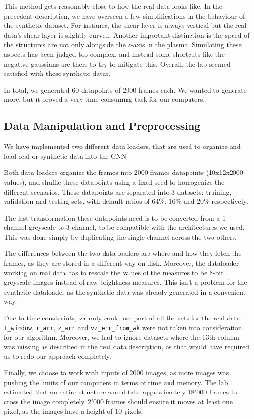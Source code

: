\documentclass[10pt,conference]{IEEEtran}
\begin{document}
This method gets reasonably close to how the real data looks like. In the precedent description, we have overseen a few simplifications in the behaviour of the synthetic dataset. For instance, the shear layer is always vertical but the real data's shear layer is slightly curved. Another important distinction is the speed of the structures are not only alongside the $z$-axis in the plasma. Simulating these aspects has been judged too complex, and instead some shortcuts like the negative gaussians are there to try to mitigate this. Overall, the lab seemed satisfied with these synthetic datas.\par
In total, we generated 60 datapoints of 2000 frames each. We wanted to generate more, but it proved a very time consuming task for our computers.
 


\subsection{Data Manipulation and Preprocessing}
We have implemented two different data loaders, that are used to organize and load real or synthetic data into the CNN.\par
Both data loaders organize the frames into 2000-frames datapoints (10x12x2000 values), and shuffle these datapoints using a fixed seed to homogenize the different scenarios. These datapoints are separated into 3 datasets: training, validation and testing sets, with default ratios of 64\%, 16\% and 20\% respectively.\par
The last transformation these datapoints need is to be converted from a 1-channel greyscale to 3-channel, to be compatible with the architectures we used. This was done simply by duplicating the single channel across the two others.\par
The differences between the two data loaders are where and how they fetch the frames, as they are stored in a different way on disk. Moreover, the dataloader working on real data has to rescale the values of the measures to be 8-bit greyscale images instead of raw brightness measures. This isn't a problem for the synthetic dataloader as the synthetic data was already generated in a convenient way.

Due to time constraints, we only could use part of all the sets for the real data: \texttt{t\_window}, \texttt{r\_arr}, \texttt{z\_arr} and \texttt{vz\_err\_from\_wk} were not taken into consideration for our algorithm. Moreover, we had to ignore datasets where the 13th column was missing as described in the real data description, as that would have required us to redo our approach completely.\par
Finally, we choose to work with inputs of 2000 images, as more images was pushing the limits of our computers in terms of time and memory. The lab estimated that an entire structure would take approximately 18'000 frames to cross the image completely. 2'000 frames should ensure it moves at least one pixel, as the images have a height of 10 pixels.\par
\end{document}
